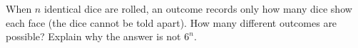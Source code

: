 When $n$ identical dice are rolled, an outcome records only how many dice show each face (the dice cannot be told apart). How many different outcomes are possible? Explain why the answer is not $6^n$.
